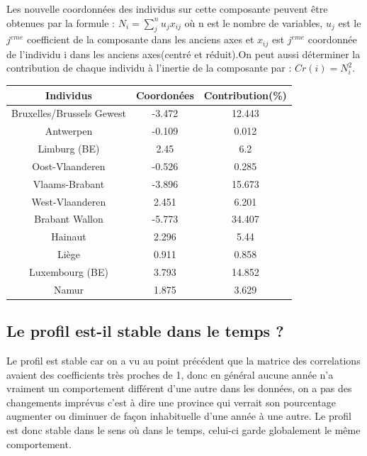 \documentclass{article}
\begin{document}
Les nouvelle coordonnées des individus sur cette composante peuvent être obtenues par la formule : $N_i=\sum_j^n u_j x_{ij}$ où n est le nombre de variables, $u_j$ est le $j^{eme}$ coefficient de la composante dans les anciens axes et $x_{ij}$ est $j^{eme}$ coordonnée de l'individu i dans les anciens axes(centré et réduit).On peut aussi déterminer la contribution de chaque individu à l'inertie de la composante par : $Cr(i)=N_i^2$.
\begin{table}[h]
\centering 
\begin{tabular}{|c|c|c|} 
  \hline
  Individus & Coordonées & Contribution(\%)\\
  \hline
  Bruxelles/Brussels Gewest & -3.472 & 12.443\\
  \hline  
  Antwerpen         &   -0.109    &    0.012\\
  \hline  
  Limburg (BE)       &     2.45   &   6.2\\
  \hline  
  Oost-Vlaanderen     &  -0.526   &    0.285\\
  \hline  
  Vlaams-Brabant       &  -3.896 &    15.673\\
  \hline  
  West-Vlaanderen     &   2.451  &     6.201\\
  \hline  
  Brabant Wallon     &   -5.773 &     34.407\\
  \hline
  Hainaut             &  2.296 &      5.44\\
  \hline  
  Liège              &  0.911  &     0.858\\
  \hline  
  Luxembourg (BE)     & 3.793 &      14.852\\
  \hline
  Namur              & 1.875   &      3.629\\
  \hline
\end{tabular}
\end{table}

 \newpage
\subsection{Le profil est-il stable dans le temps ?}

Le profil est stable car on a vu au point précédent que la matrice des correlations avaient des coefficients très proches de 1, donc en général aucune année n'a vraiment un comportement différent d'une autre dans les données, on a pas des changements imprévus c'est à dire une province qui verrait son pourcentage augmenter ou diminuer de façon inhabituelle d'une année à une autre. Le profil est donc stable dans le sens où dans le temps, celui-ci garde globalement le même comportement. 
\end{document}
